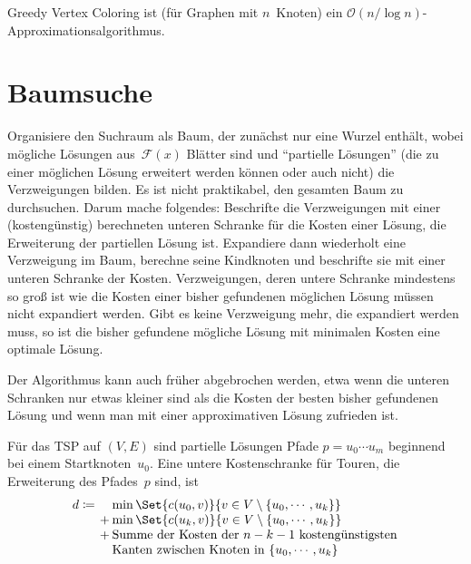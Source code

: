 \documentclass{cheat-sheet}
\newcommand{\Feasible}{\mathcal{F}} %
\renewcommand{\O}{\mathcal{O}} %
\begin{document}
\begin{satz}
  Greedy Vertex Coloring ist (für Graphen mit $n$~Knoten) ein $\O(n / \log n)$-Approximationsalgorithmus.
\end{satz}

\section{Baumsuche}



\begin{strategie}
  Organisiere den Suchraum als Baum, der zunächst nur eine Wurzel enthält, wobei mögliche Lösungen aus~$\Feasible(x)$ Blätter sind und "`partielle Lösungen"' (die zu einer möglichen Lösung erweitert werden können oder auch nicht) die Verzweigungen bilden.
  Es ist nicht praktikabel, den gesamten Baum zu durchsuchen.
  Darum mache folgendes:
  Beschrifte die Verzweigungen mit einer (kostengünstig) berechneten unteren Schranke für die Kosten einer Lösung, die Erweiterung der partiellen Lösung ist.
  Expandiere dann wiederholt eine Verzweigung im Baum, \dh{} berechne seine Kindknoten und beschrifte sie mit einer unteren Schranke der Kosten.
  Verzweigungen, deren untere Schranke mindestens so groß ist wie die Kosten einer bisher gefundenen möglichen Lösung müssen nicht expandiert werden.
  Gibt es keine Verzweigung mehr, die expandiert werden muss, so ist die bisher gefundene mögliche Lösung mit minimalen Kosten eine optimale Lösung.
\end{strategie}

\begin{bem}
  Der Algorithmus kann auch früher abgebrochen werden, etwa wenn die unteren Schranken nur etwas kleiner sind als die Kosten der besten bisher gefundenen Lösung und wenn man mit einer approximativen Lösung zufrieden ist.
\end{bem}

\begin{bsp}
  Für das TSP auf $(V, E)$ sind partielle Lösungen Pfade $p = u_0 \cdots u_m$ beginnend bei einem Startknoten~$u_0$.
  Eine untere Kostenschranke für Touren, die Erweiterung des Pfades~$p$ sind, ist
  \[
    \arraycolsep=1pt
    d \coloneqq
    \begin{array}[t]{r l}
      & \min \Set{c(u_0, v)}{v \in V \setminus \{ u_0, \cdots, u_k \}} \\
      +& \min \Set{c(u_k, v)}{v \in V \setminus \{ u_0, \cdots, u_k \}} \\
      +& \text{Summe der Kosten der $n-k-1$ kostengünstigsten} \\
      & \text{Kanten zwischen Knoten in } \{ u_0, \cdots, u_k \}
    \end{array}
  \]
\end{bsp}
\end{document}
